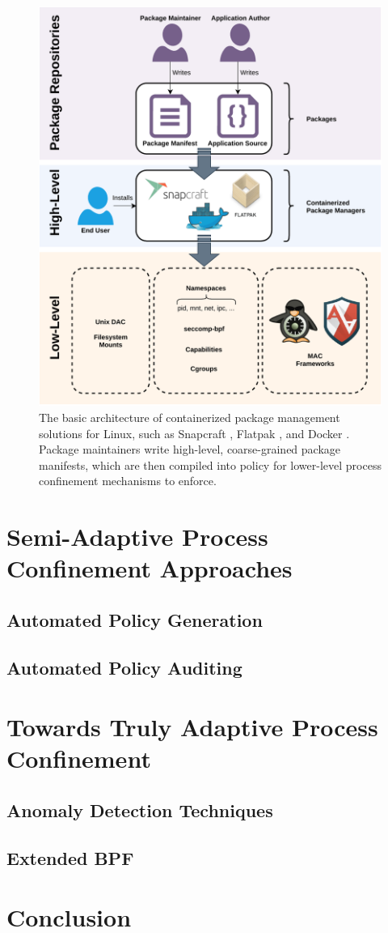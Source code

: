 \documentclass[dvipsnames, 12pt]{article}
\begin{document}
\begin{figure}[htpb]
    \centering
    \includegraphics[width=0.6\linewidth]{figs/high-level.pdf}
    \caption{
        The basic architecture of containerized package management solutions for
        Linux, such as Snapcraft \cite{snap}, Flatpak \cite{flatpak}, and Docker
        \cite{docker}. Package maintainers write high-level, coarse-grained
        package manifests, which are then compiled into policy for lower-level
        process confinement mechanisms to enforce.
    }%
    \label{fig:containerized}
\end{figure}



\section{Semi-Adaptive Process Confinement Approaches}
\label{sec:semi-adaptive}

\subsection{Automated Policy Generation}

\subsection{Automated Policy Auditing}

\section{Towards Truly Adaptive Process Confinement}
\label{sec:towards}

\subsection{Anomaly Detection Techniques}

\subsection{Extended BPF}

\section{Conclusion}
\label{sec:conclusion}


\clearpage
\printbibliography
\end{document}
